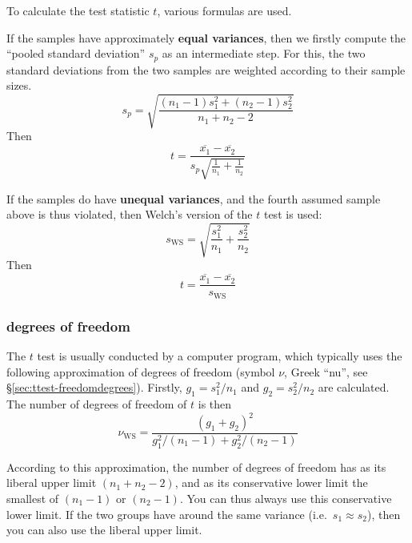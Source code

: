 \documentclass[
]{book}
\begin{document}
To calculate the test statistic \(t\), various formulas are used.

If the samples have approximately \textbf{equal variances}, then we firstly compute
the ``pooled standard deviation'' \(s_p\) as an intermediate step. For this, the two
standard deviations from the two samples are weighted according
to their sample sizes.
\begin{equation}
    s_p = \sqrt{ \frac{(n_1-1) s^2_1 + (n_2-1) s^2_2} {n_1+n_2-2} }
    \label{eq:sd-pooled}
\end{equation}
Then
\begin{equation}
  \label{eq:t-homoskedastic}
  t = \frac{ \overline{x_1}-\overline{x_2} } { s_p \sqrt{\frac{1}{n_1}+\frac{1}{n_2}} }
\end{equation}

If the samples do have \textbf{unequal variances}, and the fourth assumed
sample above is thus violated, then Welch's version of the \(t\) test is
used:
\begin{equation}
  \label{eq:sd-WS}
  s_{\textrm{WS}} = \sqrt{\frac{s^2_1}{n_1}+\frac{s^2_2}{n_2} }
\end{equation}
Then
\begin{equation}
  \label{eq:t-WS}
  t = \frac{ \overline{x_1}-\overline{x_2} } { s_{\textrm{WS}} }
\end{equation}

\hypertarget{freedomdegrees}{%
\subsubsection{degrees of freedom}\label{freedomdegrees}}

The \(t\) test is usually conducted by a computer program, which typically uses the following approximation of degrees of freedom (symbol \(\nu\), Greek ``nu'', see §\ref{sec:ttest-freedomdegrees}).
Firstly, \(g_1=s^2_1/n_1\)
and \(g_2=s^2_2/n_2\) are calculated. The number of degrees of freedom of \(t\) is then
\begin{equation}
  \label{eq:df-WS}
  \nu_\textrm{WS} = 
        \frac {(g_1+g_2)^2} {g^2_1/(n_1-1) + g^2_2/(n_2-1)}
\end{equation}

According to this approximation, the number of degrees of freedom has as its liberal
upper limit \((n_1+n_2-2)\), and as its conservative lower limit the smallest
of \((n_1-1)\) or \((n_2-1)\). You can thus always use this conservative
lower limit. If the two groups have around the same variance
(i.e.~\(s_1 \approx s_2\)), then you can also use the liberal upper
limit.
\end{document}
